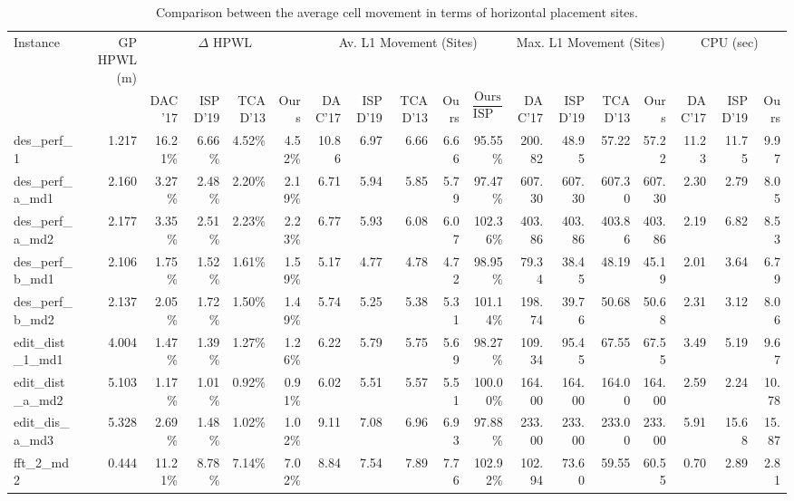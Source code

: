 \documentclass{article}
\begin{document}
\begin{center}

\begin{table*}[t]
    \caption{Comparison between the average cell movement in terms of horizontal placement sites.}\label{TableAvMovement}
    \begin{center}
     \begin{tabular}{|l|r|rrrr|rrrrr|rrrr|rrr|}
     \toprule
     Instance & GP HPWL (m)& \multicolumn{4}{c|}{$\Delta$ HPWL} & \multicolumn{5}{c|}{Av. L1 Movement (Sites)} & \multicolumn{4}{c|}{Max. L1 Movement (Sites)} & \multicolumn{3}{c|}{CPU (sec)} \\
     & & DAC'17 & ISPD'19 & TCAD'13 & Ours & DAC'17 & ISPD'19 & TCAD'13 & Ours & $\dfrac{\text{Ours}}{\text{ISPD'19}}$ & DAC'17 & ISPD'19 & TCAD'13 & Ours & DAC'17 & ISPD'19  & Ours\\
     \midrule
     des\_perf\_1	& 1.217	& 16.21\%	& 6.66\%	& 4.52\%	& 4.52\%	& 10.86	& 6.97	& 6.66	& 6.66	& 95.55\%	& 200.82	& 48.95	& 57.22	& 57.22	& 11.23	& 11.75	& 9.97 \\
   des\_perf\_ a\_md1	& 2.160	& 3.27\%	& 2.48\%	& 2.20\%	& 2.19\%	& 6.71	& 5.94	& 5.85	& 5.79	& 97.47\%	& 607.30	& 607.30	& 607.30	& 607.30	& 2.30	& 2.79	& 8.05\\
   des\_perf\_a\_md2	& 2.177	& 3.35\%	& 2.51\%	& 2.23\%	& 2.23\%	& 6.77	& 5.93	& 6.08	& 6.07	& 102.36\%	& 403.86	& 403.86	& 403.86	& 403.86	& 2.19	& 6.82	& 8.53\\
   des\_perf\_b\_md1	& 2.106	& 1.75\%	& 1.52\%	& 1.61\%	& 1.59\%	& 5.17	& 4.77	& 4.78	& 4.72	& 98.95\%	& 79.34	& 38.45	& 48.19	& 45.19	& 2.01	& 3.64	& 6.79\\
   des\_perf\_b\_md2	& 2.137	& 2.05\%	& 1.72\%	& 1.50\%	& 1.49\%	& 5.74	& 5.25	& 5.38	& 5.31	& 101.14\%	& 198.74	& 39.76	& 50.68	& 50.68	& 2.31	& 3.12	& 8.06\\
   edit\_dist\_1\_md1	& 4.004	& 1.47\%	& 1.39\%	& 1.27\%	& 1.26\%	& 6.22	& 5.79	& 5.75	& 5.69	& 98.27\%	& 109.34	& 95.45	& 67.55	& 67.55	& 3.49	& 5.19	& 9.67\\
   edit\_dist\_a\_md2	& 5.103	& 1.17\%	& 1.01\%	& 0.92\%	& 0.91\%	& 6.02	& 5.51	& 5.57	& 5.51	& 100.00\%	& 164.00	& 164.00	& 164.00	& 164.00	& 2.59	& 2.24	& 10.78\\
   edit\_dis\_ a\_md3	& 5.328	& 2.69\%	& 1.48\%	& 1.02\%	& 1.02\%	& 9.11	& 7.08	& 6.96	& 6.93	& 97.88\%	& 233.00	& 233.00	& 233.00	& 233.00	& 5.91	& 15.68	& 15.87\\
   fft\_2\_md2	& 0.444	& 11.21\%	& 8.78\%	& 7.14\%	& 7.02\%	& 8.84	& 7.54	& 7.89	& 7.76	& 102.92\%	& 102.94	& 73.60	& 59.55	& 60.55	& 0.70	& 2.89	& 2.81\\

\end{tabular}
\end{center}
\end{table*}
\end{center}
\end{document}
